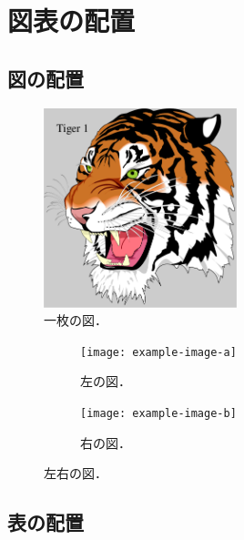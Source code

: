 \chapter{図表の配置}
\label{ch:figure_table}



\section{図の配置}
\label{sec:figure}


\begin{figure}
    \centering
    \includegraphics[width=0.5\textwidth]{figure/tiger1.pdf}
    \caption{一枚の図．}
    \label{fig:example}
\end{figure}


\begin{figure}
    \centering
    \begin{subfigure}{0.45\textwidth}
        \centering
        \texttt{[image: example-image-a]}
        \caption{左の図．}
        \label{subfig:example_a}
    \end{subfigure}
    \hfill %
    \begin{subfigure}{0.45\textwidth}
        \centering
        \texttt{[image: example-image-b]}
        \caption{右の図．}
        \label{subfig:example_b}
    \end{subfigure}
    \caption{左右の図．}
    \label{fig:example2}
\end{figure}




\section{表の配置}
\label{sec:table}




